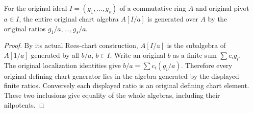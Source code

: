 \begin{lemma}
\label{lem:kn-nadel-nef-big-rees-chart-generators}
\leanok
{}
For the original ideal $I=(g_1,\ldots,g_s)$ of a commutative ring $A$
and original pivot $a\in I$, the entire original chart algebra $A[I/a]$
is generated over $A$ by the original ratios $g_1/a,\ldots,g_s/a$.
\end{lemma}
\begin{proof}
By its actual Rees-chart construction, $A[I/a]$ is the subalgebra of
$A[1/a]$ generated by all $b/a$, $b\in I$. Write an original $b$ as a
finite sum $\sum c_i g_i$. The original localization identities give
$b/a=\sum c_i(g_i/a)$. Therefore every original defining chart generator
lies in the algebra generated by the displayed finite ratios. Conversely
each displayed ratio is an original defining chart element. These two
inclusions give equality of the whole algebras, including their nilpotents.
\end{proof}

